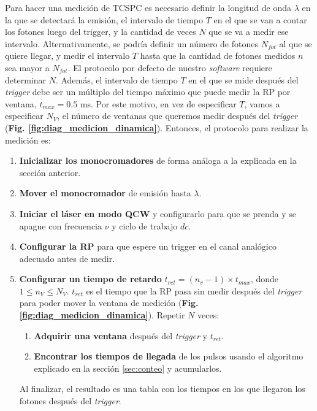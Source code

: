 Para hacer una medición de TCSPC es necesario definir la longitud de onda $\lambda$ en la que se detectará la emisión, el intervalo de tiempo $T$ en el que se van a contar los fotones luego del trigger, y la cantidad de veces $N$ que se va a medir ese intervalo.
Alternativamente, se podría definir un número de fotones $N_{fot}$ al que se quiere llegar, y medir el intervalo $T$ hasta que la cantidad de fotones medidos $n$ sea mayor a $N_{fot}$.
El protocolo por defecto de nuestro \textit{software} requiere determinar $N$.
Además, el intervalo de tiempo $T$ en el que se mide después del \textit{trigger} debe ser un múltiplo del tiempo máximo que puede medir la RP por ventana, $t_{max} = 0.5$ ms.
Por este motivo, en vez de especificar $T$, vamos a especificar $N_V$, el número de ventanas que queremos medir después del \textit{trigger} (\textbf{Fig. \ref{fig:diag_medicion_dinamica}}).
Entonces, el protocolo para realizar la medición es:

\begin{enumerate}
     \item \textbf{Inicializar los monocromadores} de forma análoga a la explicada en la sección anterior.
     \item \textbf{Mover el monocromador} de emisión hasta $\lambda$.
     \item \textbf{Iniciar el láser en modo QCW} y configurarlo para que se prenda y se apague con frecuencia $\nu$ y ciclo de trabajo $dc$.
     \item \textbf{Configurar la RP} para que espere un trigger en el canal analógico adecuado antes de medir.
     \item \textbf{Configurar un tiempo de retardo} $t_{ret} = (n_v - 1) \times t_{max}$, donde $1 \leq n_V \leq N_V$. $t_{ret}$ es el tiempo que la RP pasa sin medir después del \textit{trigger} para poder mover la ventana de medición (\textbf{Fig. \ref{fig:diag_medicion_dinamica}}). Repetir $N$ veces:
     \begin{enumerate}
          \item \textbf{Adquirir una ventana} después del \textit{trigger} y $t_{ret}$.
          \item \textbf{Encontrar los tiempos de llegada} de los pulsos usando el algoritmo explicado en la sección \ref{sec:conteo} y acumularlos.
     \end{enumerate}
     Al finalizar, el resultado es una tabla con los tiempos en los que llegaron los fotones después del \textit{trigger}.
\end{enumerate}

